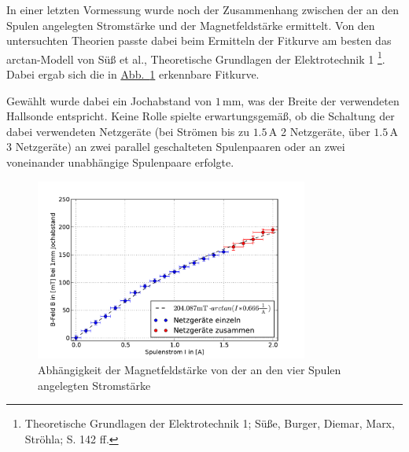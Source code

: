 \documentclass[11pt]{scrartcl}
\newcommand{\unit}[1]{\ensuremath{\,\mathrm{#1}}} %
\begin{document}
In einer letzten Vormessung wurde noch der Zusammenhang zwischen der an den Spulen angelegten Stromstärke und der Magnetfeldstärke ermittelt. Von den untersuchten Theorien passte dabei beim Ermitteln der Fitkurve am besten das arctan-Modell von Süß et al., Theoretische Grundlagen der Elektrotechnik 1 \footnote{Theoretische Grundlagen der Elektrotechnik 1; Süße, Burger, Diemar, Marx, Ströhla; S. 142 ff.}. Dabei ergab sich die in \hyperref[messung_Strom-B-Feld]{Abb.~\ref{messung_Strom-B-Feld}} erkennbare Fitkurve.

Gewählt wurde dabei ein Jochabstand von $1\unit{mm}$, was der Breite der verwendeten Hallsonde entspricht. Keine Rolle spielte erwartungsgemäß, ob die Schaltung der dabei verwendeten Netzgeräte (bei Strömen bis zu $1.5\unit{A}$ 2 Netzgeräte, über $1.5\unit{A}$ 3 Netzgeräte) an zwei parallel geschalteten Spulenpaaren oder an zwei voneinander unabhängige Spulenpaare erfolgte.

\begin{figure}[ht]
\begin{center}
\includegraphics[width=0.8\textwidth]{images/messung_Strom-B-Feld.pdf}
\end{center}
\vspace{-1.5\baselineskip}
\caption{Abhängigkeit der Magnetfeldstärke von der an den vier Spulen angelegten Stromstärke}
\label{messung_Strom-B-Feld}
\end{figure}
\end{document}
